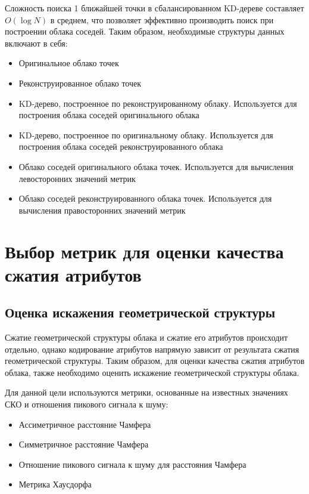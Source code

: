 Сложность поиска 1 ближайшей точки в сбалансированном KD-дереве составляет
$O\left(\log N\right)$ в среднем\cite[25]{PointCloudAnalysis}, что позволяет
эффективно производить поиск при построении облака соседей. Таким образом,
необходимые структуры данных включают в себя:

\begin{itemize}
    \item Оригинальное облако точек
    \item Реконструированное облако точек
    \item KD-дерево, построенное по реконструированному облаку. Используется для
    построения облака соседей оригинального облака
    \item KD-дерево, построенное по оригинальному облаку. Используется для
    построения облака соседей реконструированного облака
    \item Облако соседей оригинального облака точек. Используется для вычисления
    левосторонних значений метрик
    \item Облако соседей реконструированного облака точек. Используется для
    вычисления правосторонних значений метрик
\end{itemize}


\section{Выбор метрик для оценки качества сжатия атрибутов}


\subsection{Оценка искажения геометрической структуры}

Сжатие геометрической структуры облака и сжатие его атрибутов происходит
отдельно, однако кодирование атрибутов напрямую зависит от результата сжатия
геометрической структуры. Таким образом, для оценки качества сжатия атрибутов
облака, также необходимо оценить искажение геометрической структуры облака.

Для данной цели используются метрики, основанные на известных значениях СКО и
отношения пикового сигнала к шуму\cite{Wu2020}:

\begin{itemize}
    \item Ассиметричное расстояние Чамфера
    \item Симметричное расстояние Чамфера
    \item Отношение пикового сигнала к шуму для расстояния Чамфера
    \item Метрика Хаусдорфа
\end{itemize}

